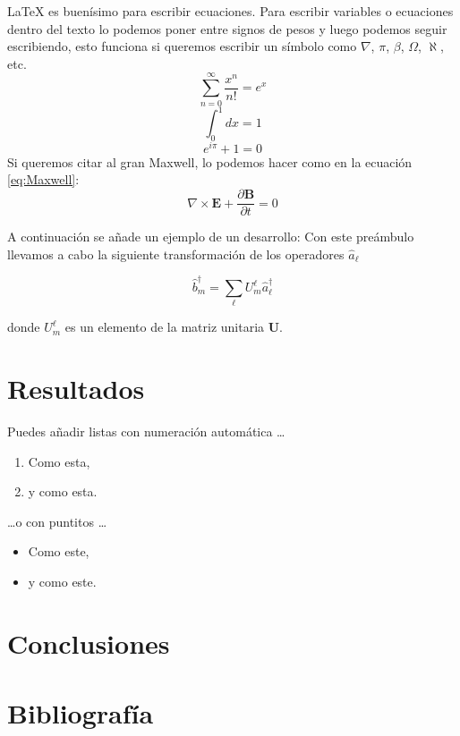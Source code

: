 \documentclass[12pt]{article}
\begin{document}
\LaTeX{} es buenísimo para escribir ecuaciones. Para escribir variables o ecuaciones dentro del texto lo podemos poner entre signos de pesos y luego podemos seguir escribiendo, esto funciona si queremos escribir un símbolo como $\nabla$, $\pi$, $\beta$, $\Omega$, $\aleph$, etc.
\begin{equation}
\sum_{n=0}^\infty \frac{x^n}{n!}=e^x
\end{equation}
\begin{equation}
\int_{0}^{1}dx=1
\end{equation}
\begin{equation}
e^{i\pi}+1=0
\end{equation}
Si queremos citar al gran Maxwell, lo podemos hacer como en la ecuación \ref{eq:Maxwell}:
\begin{equation}
\nabla\times\mathbf{E}+\frac{\partial\mathbf{B}}{\partial t}=0\label{eq:Maxwell}
\end{equation}

A continuación se añade un ejemplo de un desarrollo:
Con este preámbulo llevamos a cabo la siguiente transformación de los operadores $\hat{a}_{\ell}$

\begin{equation}
\hat{b}_{m}^{\dagger}=\sum_{\ell}U_{m}^{\ell}\hat{a}_{\ell}^{\dagger}
\end{equation}

donde $U_{m}^{\ell}$ es un elemento de la matriz unitaria $\mathbf{U}$.



\section{Resultados}

Puedes añadir listas con numeración automática \dots

\begin{enumerate}
\item Como esta,
\item y como esta.
\end{enumerate}
\dots o con puntitos \dots
\begin{itemize}
\item Como este,
\item y como este.
\end{itemize}



\section{Conclusiones}

\section{Bibliografía}
\end{document}
